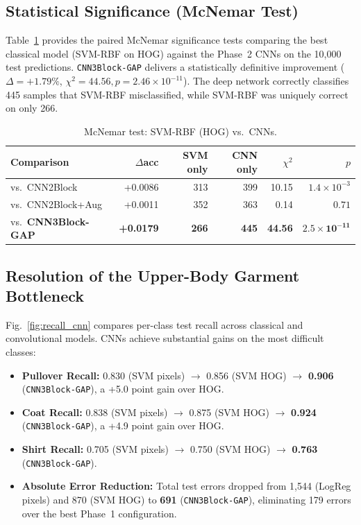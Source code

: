 \documentclass[conference]{IEEEtran}
\begin{document}
\subsection{Statistical Significance (McNemar Test)}
Table~\ref{tab:mc_cnn} provides the paired McNemar significance tests comparing the best classical model (SVM-RBF on HOG) against the Phase~2 CNNs on the 10{,}000 test predictions. \texttt{CNN3Block-GAP} delivers a statistically definitive improvement ($\Delta = +1.79\%$, $\chi^2 = 44.56, p = 2.46 \times 10^{-11}$). The deep network correctly classifies 445 samples that SVM-RBF misclassified, while SVM-RBF was uniquely correct on only 266.

\begin{table}[t]\centering\caption{McNemar test: SVM-RBF (HOG) vs.\ CNNs.}\label{tab:mc_cnn}
\begin{tabular}{@{}lrrrrr@{}}\toprule
Comparison & $\Delta$acc & SVM only & CNN only & $\chi^2$ & $p$\\\midrule
vs.\ CNN2Block & +0.0086 & 313 & 399 & 10.15 & $1.4\times10^{-3}$\\
vs.\ CNN2Block+Aug & +0.0011 & 352 & 363 & 0.14 & $0.71$\\
vs.\ \textbf{CNN3Block-GAP} & \textbf{+0.0179} & \textbf{266} & \textbf{445} & \textbf{44.56} & $\mathbf{2.5\times10^{-11}}$\\\bottomrule
\end{tabular}\end{table}

\subsection{Resolution of the Upper-Body Garment Bottleneck}
Fig.~\ref{fig:recall_cnn} compares per-class test recall across classical and convolutional models. CNNs achieve substantial gains on the most difficult classes:
\begin{itemize}
\item \textbf{Pullover Recall:} 0.830 (SVM pixels) $\to$ 0.856 (SVM HOG) $\to$ \textbf{0.906} (\texttt{CNN3Block-GAP}), a +5.0 point gain over HOG.
\item \textbf{Coat Recall:} 0.838 (SVM pixels) $\to$ 0.875 (SVM HOG) $\to$ \textbf{0.924} (\texttt{CNN3Block-GAP}), a +4.9 point gain over HOG.
\item \textbf{Shirt Recall:} 0.705 (SVM pixels) $\to$ 0.750 (SVM HOG) $\to$ \textbf{0.763} (\texttt{CNN3Block-GAP}).
\item \textbf{Absolute Error Reduction:} Total test errors dropped from 1{,}544 (LogReg pixels) and 870 (SVM HOG) to \textbf{691} (\texttt{CNN3Block-GAP}), eliminating 179 errors over the best Phase~1 configuration.
\end{itemize}
\end{document}

